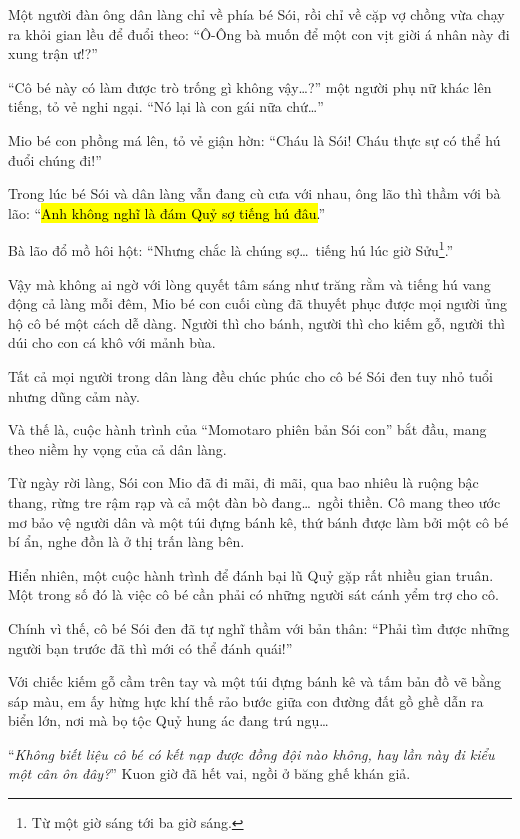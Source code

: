 \documentclass[../main.tex]{subfiles}
\begin{document}
Một người đàn ông dân làng chỉ về phía bé Sói, rồi chỉ về cặp vợ chồng vừa chạy ra khỏi gian lều để đuổi theo: ``Ô-Ông bà muốn để một con vịt giời á nhân này đi xung trận ư!?''

``Cô bé này có làm được trò trống gì không vậy\dots?'' một người phụ nữ khác lên tiếng, tỏ vẻ nghi ngại. ``Nó lại là con gái nữa chứ\dots''

Mio bé con phồng má lên, tỏ vẻ giận hờn: ``Cháu là Sói! Cháu thực sự có thể hú đuổi chúng đi!''

Trong lúc bé Sói và dân làng vẫn đang cù cưa với nhau, ông lão thì thầm với bà lão: ``\hl{Anh không nghĩ là đám Quỷ sợ tiếng hú đâu.}''

Bà lão đổ mồ hôi hột: ``Nhưng chắc là chúng sợ\dots\ tiếng hú lúc giờ Sửu\footnote{Từ một giờ sáng tới ba giờ sáng.}.''

Vậy mà không ai ngờ với lòng quyết tâm sáng như trăng rằm và tiếng hú vang động cả làng mỗi đêm, Mio bé con cuối cùng đã thuyết phục được mọi người ủng hộ cô bé một cách dễ dàng. Người thì cho bánh, người thì cho kiếm gỗ, người thì dúi cho con cá khô với mảnh bùa.

Tất cả mọi người trong dân làng đều chúc phúc cho cô bé Sói đen tuy nhỏ tuổi nhưng dũng cảm này.

Và thế là, cuộc hành trình của ``Momotaro phiên bản Sói con'' bắt đầu, mang theo niềm hy vọng của cả dân làng.

\ct

Từ ngày rời làng, Sói con Mio đã đi mãi, đi mãi, qua bao nhiêu là ruộng bậc thang, rừng tre rậm rạp và cả một đàn bò đang\dots\ ngồi thiền. Cô mang theo ước mơ bảo vệ người dân và một túi đựng bánh kê, thứ bánh được làm bởi một cô bé bí ẩn, nghe đồn là ở thị trấn làng bên.

Hiển nhiên, một cuộc hành trình để đánh bại lũ Quỷ gặp rất nhiều gian truân. Một trong số đó là việc cô bé cần phải có những người sát cánh yểm trợ cho cô.

Chính vì thế, cô bé Sói đen đã tự nghĩ thầm với bản thân: ``Phải tìm được những người bạn trước đã thì mới có thể đánh quái!''

Với chiếc kiếm gỗ cầm trên tay và một túi đựng bánh kê và tấm bản đồ vẽ bằng sáp màu, em ấy hừng hực khí thế rảo bước giữa con đường đất gồ ghề dẫn ra biển lớn, nơi mà bọ tộc Quỷ hung ác đang trú ngụ\dots

``\textit{Không biết liệu cô bé có kết nạp được đồng đội nào không, hay lần này đi kiểu một cân ôn đây?}'' Kuon giờ đã hết vai, ngồi ở băng ghế khán giả.
\end{document}
